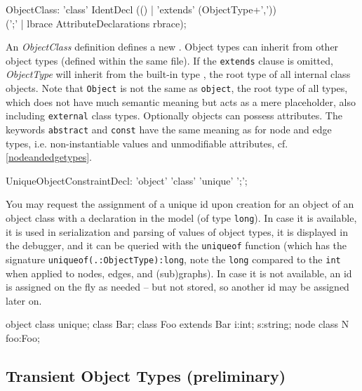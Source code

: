 \begin{rail}
  ObjectClass: 'class' IdentDecl (() | 'extends' (ObjectType+',')) \\
    (';' | lbrace AttributeDeclarations rbrace);
\end{rail}
An \emph{ObjectClass} definition defines a new .
Object types can inherit from other object types (defined within the same file).
If the \texttt{extends} clause is omitted, \emph{ObjectType} will inherit from the built-in type \texttt{}, the root type of all internal class objects.
Note that \texttt{Object} is not the same as \texttt{object}, the root type of all types, which does not have much semantic meaning but acts as a mere placeholder, also including \texttt{external} class types.
Optionally objects can possess attributes.
The keywords \texttt{abstract} and \texttt{const} have the same meaning as for node and edge types, i.e. non-instantiable values and unmodifiable attributes, cf. \ref{nodeandedgetypes}.

\begin{rail}
  UniqueObjectConstraintDecl: 'object' 'class' 'unique' ';';
\end{rail}

You may request the assignment of a unique id upon creation for an object of an object class with a declaration in the model (of type \texttt{long}).
In case it is available, it is used in serialization and parsing of values of object types, it is displayed in the debugger, and it can be queried with the \texttt{uniqueof} function (which has the signature \texttt{uniqueof(.:ObjectType):long}, note the \texttt{long} compared to the \texttt{int} when applied to nodes, edges, and (sub)graphs).
In case it is not available, an id is assigned on the fly as needed -- but not stored, so another id may be assigned later on.

\begin{example}
\begin{grgen}
object class unique;
class Bar;
class Foo extends Bar
{
  i:int;
  s:string;
}
node class N
{
  foo:Foo;
}
\end{grgen}
\end{example}


\subsection{Transient Object Types (preliminary)}

